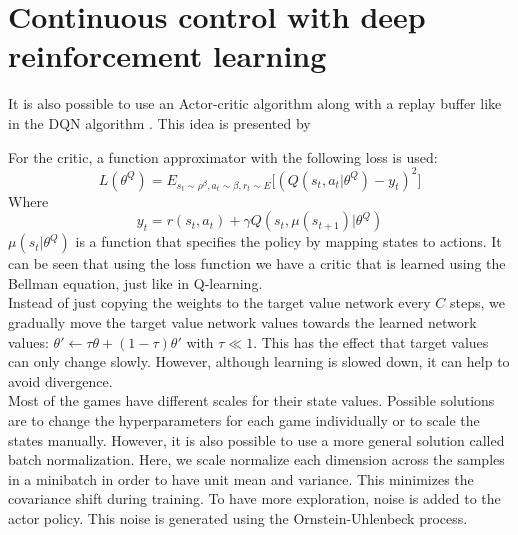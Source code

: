 \section{Continuous control with deep reinforcement learning}
It is also possible to use an Actor-critic algorithm along with a replay buffer like in the DQN algorithm \parencite{Mnih2015Human-levelLearning}. This idea is presented by \cite{Lillicrap2015ContinuousLearning}

For the critic, a function approximator with the following loss is used:
\begin{equation}
L(\theta^Q) = E_{s_t \sim \rho^{\beta}, a_t \sim \beta, r_t \sim E} \big [ (Q(s_t, a_t \vert \theta^Q) - y_t)^2 \big ]
\end{equation}
Where
\begin{equation}
y_t = r(s_t,a_t) + \gamma Q(s_t, \mu(s_{t+1}) \vert \theta^Q)
\end{equation}
$\mu(s_t \vert \theta^Q)$ is a function that specifies the policy by mapping states to actions.
It can be seen that using the loss function we have a critic that is learned using the Bellman equation, just like in Q-learning.\\

Instead of just copying the weights to the target value network every $C$ steps, we gradually move the target value network values towards the learned network values: $\theta' \leftarrow \tau \theta + (1-\tau) \theta'$ with $\tau \ll 1$.
This has the effect that target values can only change slowly.
However, although learning is slowed down, it can help to avoid divergence.\\

Most of the games have different scales for their state values.
Possible solutions are to change the hyperparameters for each game individually or to scale the states manually.
However, it is also possible to use a more general solution called batch normalization.
Here, we scale normalize each dimension across the samples in a minibatch in order to have unit mean and variance.
This minimizes the covariance shift during training.
To have more exploration, noise is added to the actor policy.
This noise is generated using the Ornstein-Uhlenbeck process.

